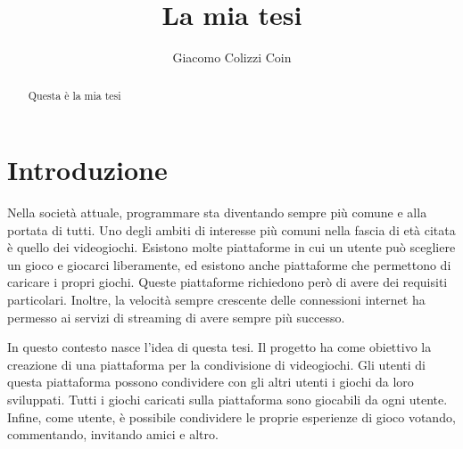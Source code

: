 \documentclass[binding=0.6cm,Lau]{sapthesis}
\title{La mia tesi}
\author{Giacomo Colizzi Coin}
\begin{document}
\frontmatter
\maketitle

\begin{abstract}
Questa è la mia tesi
\end{abstract}

\tableofcontents

\mainmatter
\chapter{Introduzione}

Nella società attuale, programmare sta diventando sempre più comune e
alla portata di tutti.
Uno degli ambiti di interesse più comuni nella fascia di età citata è
quello dei videogiochi. Esistono molte piattaforme in cui un utente
può scegliere un gioco e giocarci liberamente, ed esistono anche
piattaforme che permettono di caricare i propri giochi. Queste
piattaforme richiedono però di avere dei requisiti particolari.
Inoltre, la velocità sempre crescente delle connessioni internet ha
permesso ai servizi di streaming di avere sempre più successo.

In questo contesto nasce l'idea di questa tesi.
Il progetto ha come obiettivo la creazione di una piattaforma per la
condivisione di videogiochi. Gli utenti di questa piattaforma possono
condividere con gli altri utenti i giochi da loro sviluppati. Tutti i
giochi caricati sulla piattaforma sono giocabili da ogni utente.
Infine, come utente, è possibile condividere le proprie esperienze di
gioco votando, commentando, invitando amici e altro.

\backmatter
\cleardoublepage
{}
{}
	
\end{document}
